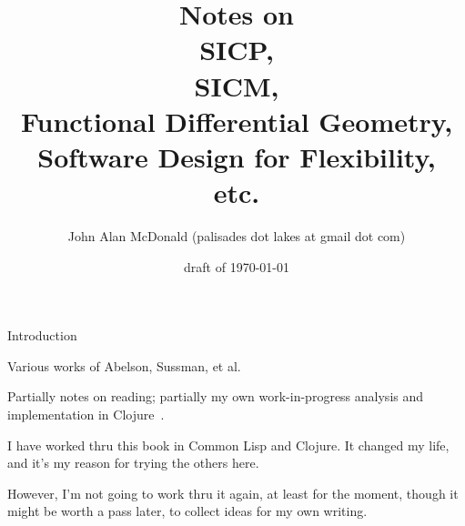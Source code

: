 \documentclass[12pt]{PalisadesLakesBook}
\title{Notes on\\
 SICP,\\
  SICM,\\
   Functional Differential Geometry,\\ 
 Software Design for Flexibility, \\
 etc.}
\author{John Alan McDonald 
(palisades dot lakes at gmail dot com)}
\date{draft of \today}
\begin{document}
\maketitle
{}
\def\sharedFolder{../../shared/}
\begin{plSection}{Introduction}

Various works of Abelson, Sussman, et al.
 
Partially notes on reading; 
partially my own work-in-progress analysis 
and implementation in 
Clojure~\cite{
EmerickCarperGrand:2012:ClojureProgramming,
FogusHouser:2011:JoyOfClojure,
Halloway:2009:Clojure,
Hickey:2012:Clojure,
Rathore:2011:Clojure,
VanderhartSierra:2009:Clojure,}.






\end{plSection}%
\begin{plSection}{}

I have worked thru this book in Common Lisp and Clojure.
It changed my life, and it's my reason for trying the others here.

However, I'm not going to work thru it again, 
at least for the moment,
though it might be worth a pass later, to collect ideas 
for my own writing.

\end{plSection}%
\begin{plSection}{}
\end{plSection}%
\begin{plSection}{}
\end{plSection}%
\end{document}
